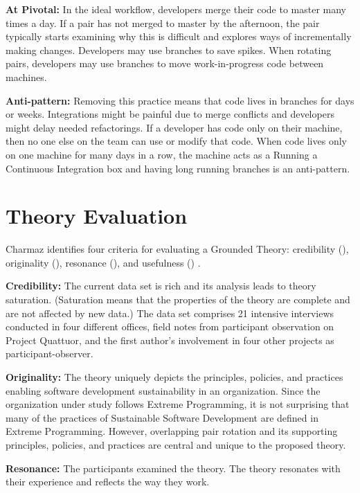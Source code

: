 \textbf{At Pivotal:} In the ideal workflow, developers merge their code to master many times a day. If a pair has not merged to master by the afternoon, the pair typically starts examining why this is difficult and explores ways of incrementally making changes. Developers may use branches to save spikes. When rotating pairs, developers may use branches to move work-in-progress code between machines. 

\textbf{Anti-pattern:} Removing this practice means that code lives in branches for days or weeks. Integrations might be painful due to merge conflicts and developers might delay needed refactorings. If a developer has code only on their machine, then no one else on the team can use or modify that code. When code lives only on one machine for many days in a row, the machine acts as a  Running a Continuous Integration box and having long running branches is an anti-pattern.
\section{Theory Evaluation}
\label{TheoryEvaluation}

Charmaz identifies four criteria for evaluating a Grounded Theory: credibility (), originality (), resonance (), and usefulness () \cite{StolGTinSE}. 

\textbf{Credibility:} The current data set is rich and its analysis leads to theory saturation. (Saturation means that the properties of the theory are complete and are not affected by new data.) The data set comprises 21 intensive interviews conducted in four different offices, field notes from participant observation on Project Quattuor, and the first author's involvement in four other projects as participant-observer.

\textbf{Originality:} The theory uniquely depicts the principles, policies, and practices enabling software development sustainability in an organization. Since the organization under study follows Extreme Programming, it is not surprising that many of the practices of Sustainable Software Development are defined in Extreme Programming. However, overlapping pair rotation and its supporting principles, policies, and practices are central and unique to the proposed theory.

\textbf{Resonance:} The participants examined the theory. The theory resonates with their experience and reflects the way they work.

